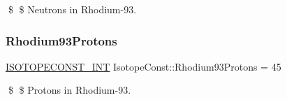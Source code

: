\$ \$ Neutrons in Rhodium-\/93. \mbox{\label{group___isotope_const-_rhodium-_rh93_gae026cbd4a4625d2a73fcce1ad8e92dee}} 
\subsubsection{\texorpdfstring{Rhodium93\+Protons}{Rhodium93Protons}}
{\footnotesize\ttfamily \mbox{\hyperlink{group___isotope_const-_macros_ga5f18360b3e99483a35c32d789e62621c}{I\+S\+O\+T\+O\+P\+E\+C\+O\+N\+S\+T\+\_\+\+I\+NT}} Isotope\+Const\+::\+Rhodium93\+Protons = 45}

\$ \$ Protons in Rhodium-\/93. 